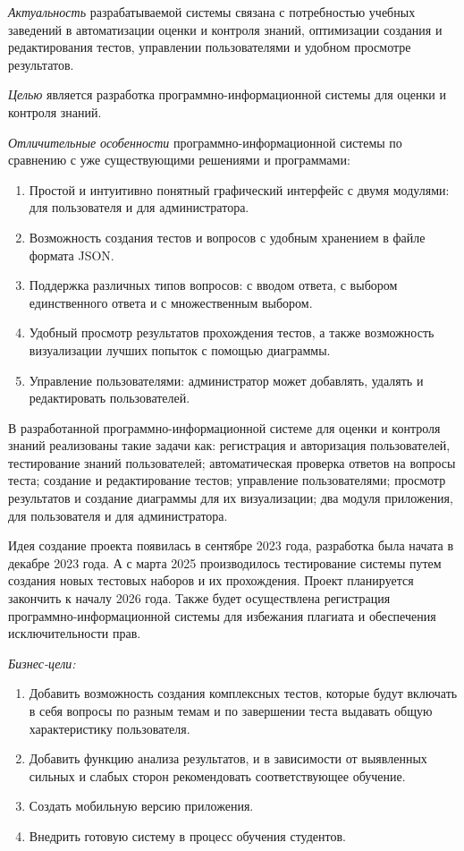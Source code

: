 \textit{Актуальность} разрабатываемой системы связана с потребностью учебных заведений в автоматизации оценки и контроля знаний, оптимизации создания и редактирования тестов, управлении пользователями и удобном просмотре результатов.

\textit{Целью} является разработка программно-информационной системы для оценки и контроля знаний. 


\textit{Отличительные особенности} программно-информационной системы по сравнению с уже существующими решениями и программами:
\begin{enumerate}
	\item Простой и интуитивно понятный графический интерфейс с двумя модулями: для пользователя и для администратора.
	\item Возможность создания тестов и вопросов с удобным хранением в файле формата JSON.
	\item Поддержка различных типов вопросов: с вводом ответа, с выбором единственного ответа и с множественным выбором.
	\item Удобный просмотр результатов прохождения тестов, а также возможность визуализации лучших попыток с помощью диаграммы.
	\item Управление пользователями: администратор может добавлять, удалять и редактировать пользователей.
\end{enumerate}


В разработанной программно-информационной системе для оценки и контроля знаний реализованы такие задачи как: регистрация и авторизация пользователей, тестирование знаний пользователей; автоматическая проверка ответов на вопросы теста; создание и редактирование тестов; управление пользователями; просмотр результатов и создание диаграммы для их визуализации; два модуля приложения, для пользователя и для администратора.

Идея создание проекта появилась в сентябре 2023 года, разработка была начата в декабре 2023 года. А с марта 2025 производилось тестирование системы путем создания новых тестовых наборов и их прохождения. Проект планируется закончить к началу 2026 года. Также будет осуществлена регистрация программно-информационной системы для избежания плагиата и обеспечения исключительности прав.

\textit{Бизнес-цели:}
 \begin{enumerate}
 	\item Добавить возможность создания комплексных тестов, которые будут включать в себя вопросы по разным темам и по завершении теста выдавать общую характеристику пользователя.
 	\item Добавить функцию анализа результатов, и в зависимости от выявленных сильных и слабых сторон рекомендовать соответствующее обучение.
 	\item Создать мобильную версию приложения.
 	\item Внедрить готовую систему в процесс обучения студентов.
 \end{enumerate}


